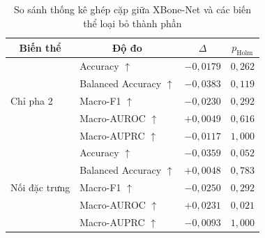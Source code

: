 \begin{table}[H]
\centering
\small
\renewcommand{\arraystretch}{1.15}
\begin{tabular}{llcc}
\toprule
\multicolumn{1}{c}{\textbf{Biến thể}} & \multicolumn{1}{c}{\textbf{Độ đo}} & \multicolumn{1}{c}{\textbf{$\Delta$}} & \multicolumn{1}{c}{\textbf{$p_{\mathrm{Holm}}$}} \\
\midrule
\multirow{5}{*}{Chỉ pha 2} & Accuracy $\uparrow$ & $-0{,}0179$ & $0{,}262$ \\
 & Balanced Accuracy $\uparrow$ & $-0{,}0383$ & $0{,}119$ \\
 & Macro-F1 $\uparrow$ & $-0{,}0230$ & $0{,}292$ \\
 & Macro-AUROC $\uparrow$ & $+0{,}0049$ & $0{,}616$ \\
 & Macro-AUPRC $\uparrow$ & $-0{,}0117$ & $1{,}000$ \\
\midrule
\multirow{5}{*}{Nối đặc trưng} & Accuracy $\uparrow$ & $-0{,}0359$ & $0{,}052$ \\
 & Balanced Accuracy $\uparrow$ & $+0{,}0048$ & $0{,}783$ \\
 & Macro-F1 $\uparrow$ & $-0{,}0250$ & $0{,}292$ \\
 & Macro-AUROC $\uparrow$ & \textcolor[RGB]{200, 0, 0}{\textbf{$+0{,}0231$}} & \textcolor[RGB]{200, 0, 0}{\textbf{$0{,}021$}} \\
 & Macro-AUPRC $\uparrow$ & $-0{,}0093$ & $1{,}000$ \\
\bottomrule
\end{tabular}%
\caption{So sánh thống kê ghép cặp giữa XBone-Net và các biến thể loại bỏ thành phần}
\label{tab:ablation_paired_statistics}
\end{table}
